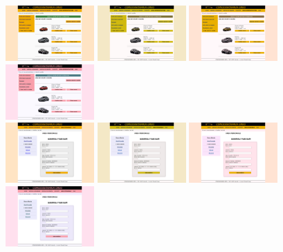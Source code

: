 \includegraphics[width=8pc]{./img/pagina_lista_veicoli_vendita-successo-normal.png} \includegraphics[width=8pc]{./img/pagina_lista_veicoli_vendita-successo-protanopia.png} \includegraphics[width=8pc]{./img/pagina_lista_veicoli_vendita-successo-deuteranopia.png} \includegraphics[width=8pc]{./img/pagina_lista_veicoli_vendita-successo-tritanopia.png}\\

\includegraphics[width=8pc]{./img/pagina_modifica_info_utente-normal.png} \includegraphics[width=8pc]{./img/pagina_modifica_info_utente-protanopia.png} \includegraphics[width=8pc]{./img/pagina_modifica_info_utente-deuteranopia.png} \includegraphics[width=8pc]{./img/pagina_modifica_info_utente-tritanopia.png}\\

\pagebreak
